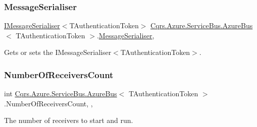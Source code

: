 \subsubsection{\texorpdfstring{Message\+Serialiser}{MessageSerialiser}}
{\footnotesize\ttfamily \hyperlink{interfaceCqrs_1_1Azure_1_1ServiceBus_1_1IMessageSerialiser}{I\+Message\+Serialiser}$<$T\+Authentication\+Token$>$ \hyperlink{classCqrs_1_1Azure_1_1ServiceBus_1_1AzureBus}{Cqrs.\+Azure.\+Service\+Bus.\+Azure\+Bus}$<$ T\+Authentication\+Token $>$.\hyperlink{classCqrs_1_1Azure_1_1ServiceBus_1_1MessageSerialiser}{Message\+Serialiser}\hspace{0.3cm}{\ttfamily [get]}, {\ttfamily [protected]}}



Gets or sets the I\+Message\+Serialiser$<$\+T\+Authentication\+Token$>$. 

\mbox{\label{classCqrs_1_1Azure_1_1ServiceBus_1_1AzureBus_a65ca2b61bf8f2dba9d0e0f54ec64c2b9_a65ca2b61bf8f2dba9d0e0f54ec64c2b9}} 
\subsubsection{\texorpdfstring{Number\+Of\+Receivers\+Count}{NumberOfReceiversCount}}
{\footnotesize\ttfamily int \hyperlink{classCqrs_1_1Azure_1_1ServiceBus_1_1AzureBus}{Cqrs.\+Azure.\+Service\+Bus.\+Azure\+Bus}$<$ T\+Authentication\+Token $>$.Number\+Of\+Receivers\+Count\hspace{0.3cm}{\ttfamily [get]}, {\ttfamily [set]}, {\ttfamily [protected]}}



The number of receivers to start and run. 

